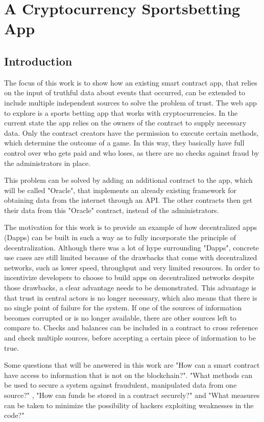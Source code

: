 \chapter{A Cryptocurrency Sportsbetting App}
\label{cha:theapp}
\section{Introduction}
The focus of this work is to show how an existing smart contract app, that relies on the input of truthful data about events that occurred, can be extended to include multiple independent sources to solve the problem of trust. The web app to explore is a sports betting app that works with cryptocurrencies. In the current state the app relies on the owners of the contract to supply necessary data. Only the contract creators have the permission to execute certain methods, which determine the outcome of a game. In this way, they basically have full control over who gets paid and who loses, as there are no checks against fraud by the administrators in place.

This problem can be solved by adding an additional contract to the app, which will be called "Oracle", that implements an already existing framework for obtaining data from the internet through an API. The other contracts then get their data from this "Oracle" contract, instead of the administrators.

The motivation for this work is to provide an example of how decentralized apps (Dapps) can be built in such a way as to fully incorporate the principle of decentralization. Although there was a lot of hype surrounding "Dapps", concrete use cases are still limited because of the drawbacks that come with decentralized networks, such as lower speed, throughput and very limited resources. In order to incentivize developers to choose to build apps on decentralized networks despite those drawbacks, a clear advantage needs to be demonstrated. This advantage is that trust in central actors is no longer necessary, which also means that there is no single point of failure for the system. If one of the sources of information becomes corrupted or is no longer available, there are other sources left to compare to. Checks and balances can be included in a contract to cross reference and check multiple sources, before accepting a certain piece of information to be true.

Some questions that will be answered in this work are "How can a smart contract have access to information that is not on the blockchain?". "What methods can be used to secure a system against fraudulent, manipulated data from one source?" , "How can funds be stored in a contract securely?" and "What measures can be taken to minimize the possibility of hackers exploiting weaknesses in the code?"
